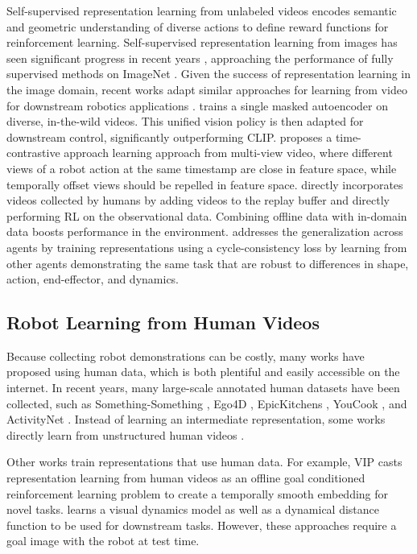 Self-supervised representation learning from unlabeled videos encodes semantic and geometric understanding of diverse actions to define reward functions for reinforcement learning. Self-supervised representation learning from images has seen significant progress in recent years \cite{pathak2016context, chen2020simclr, caron2021dino, MAE, BYOL}, approaching the performance of fully supervised methods on ImageNet \cite{russakovsky2014imagenet}. Given the success of representation learning in the image domain, recent works adapt similar approaches for learning from video for downstream robotics applications \cite{srinivas2020curl}. \cite{radasavovic22robotmaskedpretraining} trains a single masked autoencoder \cite{MAE} on diverse, in-the-wild videos. This unified vision policy is then adapted for downstream control, significantly outperforming CLIP. \cite{sermanet18timecontrastive} proposes a time-contrastive approach learning approach from multi-view video, where different views of a robot action at the same timestamp are close in feature space, while temporally offset views should be repelled in feature space. \cite{schmeckpeper20rlvideos} directly incorporates videos collected by humans by adding videos to the replay buffer and directly performing RL on the observational data. Combining offline data with in-domain data boosts performance in the environment. \cite{zakka21xirl} addresses the generalization across agents by training representations using a cycle-consistency loss by learning from other agents demonstrating the same task that are robust to differences in shape, action, end-effector, and dynamics. 


\subsection{Robot Learning from Human Videos} 

Because collecting robot demonstrations can be costly, many works have proposed using human data, which is both plentiful and easily accessible on the internet. In recent years, many large-scale annotated human datasets have been collected, such as Something-Something \cite{SomethingSomething_ICCV}, Ego4D \cite{ego4d}, EpicKitchens \cite{epickitchens}, YouCook \cite{youcook}, and ActivityNet \cite{caba2015activitynet}. Instead of learning an intermediate representation, some works directly learn from unstructured human videos \cite{bahl22whirl, shaw2022video, bahl2023affordances}.

Other works train representations \cite{r3m, radasavovic22robotmaskedpretraining, VIP, radford21clip} that use human data. For example, VIP \cite{VIP} casts representation learning from human videos as an offline goal conditioned reinforcement learning problem to create a temporally smooth embedding for novel tasks. \cite{tian21functionaldistances} learns a visual dynamics model as well as a dynamical distance function to be used for downstream tasks. However, these approaches require a goal image with the robot at test time.

